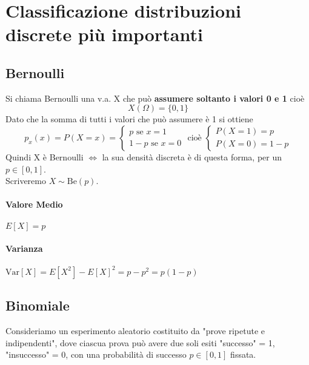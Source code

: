 \section{Classificazione distribuzioni discrete più importanti}
\subsection*{Bernoulli}
Si chiama Bernoulli una v.a. X che può \textbf{assumere soltanto i valori 0 e 1} cioè
\begin{equation*}
    X(\Omega) = \{0,1\}
\end{equation*}
Dato che la somma di tutti i valori che può assumere è 1 si ottiene
\begin{equation*}
    p_x (x) = P(X=x) = 
    \begin{cases}
    p \text{ se } x=1\\
    1-p \text{ se } x=0
    \end{cases} 
    \text{ cioè }
    \begin{cases}
        P(X=1) = p\\
        P(X=0)= 1-p
    \end{cases}
\end{equation*}
Quindi X è Bernoulli $\Leftrightarrow$ la sua densità discreta è di questa
forma, per un $p \in [0,1]$.
\\ Scriveremo $X \sim \text{Be}(p)$.
\paragraph*{Valore Medio} $E[X] = p$
\paragraph*{Varianza} $\text{Var}[X] = E[X^2] - E[X]^2 = p-p^2 = p(1-p)$

\subsection*{Binomiale}
Consideriamo un esperimento aleatorio costituito da "prove ripetute e indipendenti",
dove ciascua prova può avere due soli esiti "successo" = 1, "insuccesso" = 0, con una
probabilità di successo $p \in [0,1]$ fissata.
